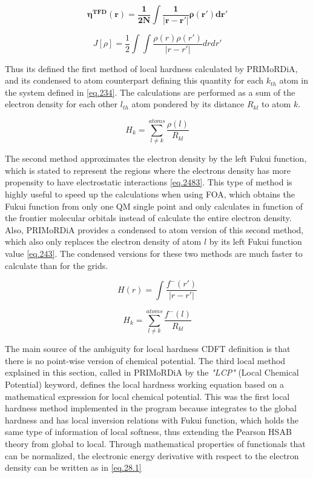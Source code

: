 \documentclass[a4paper,11pt]{refart}
\begin{document}
\begin{equation}
\mathbf{\eta^{TFD} (r) =  \frac{1}{2N} \int \frac{1}{|r-r'|} \rho(r') dr'}
\label{eq.27999} 
\end{equation}

\begin{equation}
J[\rho] = \frac{1}{2} \int \int \frac{\rho(r) \rho(r')}{|r-r'|} dr dr'
\label{eq.27.1}
\end{equation}

Thus its defined the first method of local hardness calculated by PRIMoRDiA, and its condensed to atom counterpart defining this quantity for each $k_{th}$ atom in the system defined in \autoref{eq.234}. The calculations are performed as a sum of the electron density for each other $l_{th}$ atom pondered by its distance $R_{kl}$ to atom $k$. 

\begin{equation}
H_k = \sum_{l \neq k}^{atoms} \frac{\rho(l)}{R_{kl}}
\label{eq.234}
\end{equation}

The second method approximates the electron density by the left Fukui function, which is stated to represent the regions where the electrons density has more propensity to have electrostatic interactions \autoref{eq.2483}. This type of method is highly useful to speed up the calculations when using FOA, which obtains the Fukui  function from only one QM single point and only calculates in function of the frontier molecular orbitals instead of calculate the entire electron density.  Also, PRIMoRDiA provides a condensed to atom version of this second method, which also only replaces the electron density of atom $l$ by its left Fukui function value \autoref{eq.243}. The condensed versions for these two methods are much faster to calculate than for the grids. 

\begin{equation}
H(r) = \int \frac{f^{-}(r')}{|r - r'|}
\label{eq.2483}
\end{equation}

\begin{equation}
H_k = \sum_{l \neq k}^{atoms} \frac{f^{-}(l)}{R_{kl}}
\label{eq.243}
\end{equation}

The main source of the ambiguity for local hardness CDFT definition is that there is no point-wise version of chemical potential. The third local method explained in this section, called in PRIMoRDiA by the \emph{"LCP"} (Local Chemical Potential) keyword, defines the local hardness working equation based on a mathematical expression for local chemical potential. This  was the first local hardness method implemented in the program because integrates to the global hardness and has local inversion relations with Fukui function, which holds the same type of information of local softness, thus extending the Pearson HSAB theory from global to local. Through mathematical properties of functionals that can be normalized, the electronic energy derivative with respect to the electron density can be written as in \autoref{eq.28.1}
\end{document}
